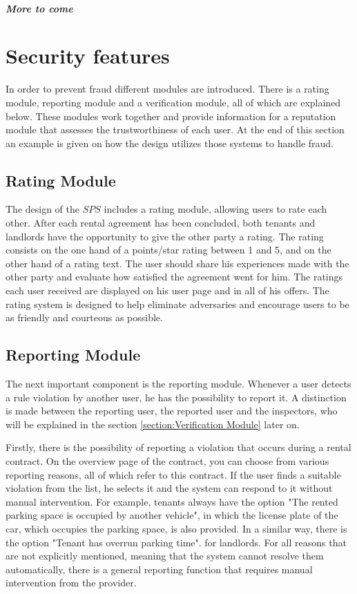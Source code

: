 \subparagraph{More to come}
  
\section{Security features}
In order to prevent fraud different modules are introduced. There is a rating module, reporting module and a verification module, all of which are explained below. These modules work together and provide information for a reputation module that assesses the trustworthiness of each user. At the end of this section an example is given on how the design utilizes those systems to handle fraud.

\subsection{Rating Module} The design of the $SPS$ includes a rating module, allowing users to rate each other. After each rental agreement has been concluded, both tenants and landlords have the opportunity to give the other party a rating. The rating consists on the one hand of a points/star rating between 1 and 5, and on the other hand of a rating text. The user should share his experiences made with the other party and evaluate how satisfied the agreement went for him. The ratings each user received are displayed on his user page and in all of his offers. The rating system is designed to help eliminate adversaries and encourage users to be as friendly and courteous as possible.

\subsection{Reporting Module} The next important component is the reporting module. Whenever a user detects a rule violation by another user, he has the possibility to report it. A distinction is made between the reporting user, the reported user and the inspectors, who will be explained in the section \ref{section:Verification Module}  later on.

Firstly, there is the possibility of reporting a violation that occurs during a rental contract. On the overview page of the contract, you can choose from various reporting reasons, all of which refer to this contract. If the user finds a suitable violation from the list, he selects it and the system can respond to it without manual intervention. For example, tenants always have the option "The rented parking space is occupied by another vehicle", in which the license plate of the car, which occupies the parking space, is also provided. In a similar way, there is the option "Tenant has overrun parking time". for landlords. For all reasons that are not explicitly mentioned, meaning that the system cannot resolve them automatically, there is a general reporting function that requires manual intervention from the provider.


